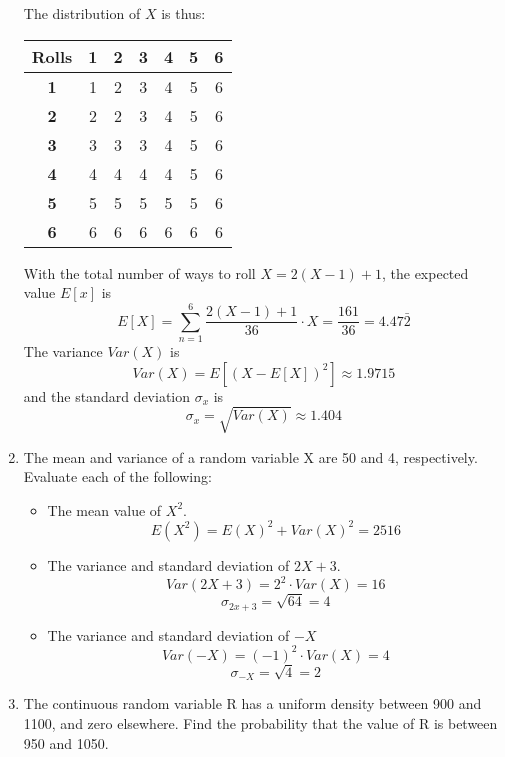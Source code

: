 \documentclass[12pt]{article}
\begin{document}
\begin{enumerate}
\begin{itemize}
\end{itemize}
The distribution of $X$ is thus:
\begin{center}
  \begin{tabular}{ |c|c|c|c|c|c|c| }
    \hline
    Rolls & \textbf{1} & \textbf{2} & \textbf{3} & \textbf{4} & \textbf{5} & \textbf{6} \\
    \hline
    \textbf{1} & 1 & 2 & 3 & 4 & 5 & 6 \\
    \textbf{2} & 2 & 2 & 3 & 4 & 5 & 6 \\
    \textbf{3} & 3 & 3 & 3 & 4 & 5 & 6 \\
    \textbf{4} & 4 & 4 & 4 & 4 & 5 & 6 \\
    \textbf{5} & 5 & 5 & 5 & 5 & 5 & 6 \\
    \textbf{6} & 6 & 6 & 6 & 6 & 6 & 6 \\
    \hline
  \end{tabular}
  \end{center}
With the total number of ways to roll $X = 2(X-1)+1$, the expected value $E[x]$ is
\[ E[X] = \sum_{n=1}^{6} \frac{2(X-1)+1}{36} \cdot X = \frac{161}{36} = 4.47\bar{2} \]
The variance $Var(X)$ is 
\[ Var(X) = E[(X - E[X])^2] \approx 1.9715 \]
and the standard deviation $\sigma_x$ is
\[ \sigma_x = \sqrt{Var(X)} \approx 1.404 \]
\newpage
\item The mean and variance of a random variable X are 50 and 4, respectively.  Evaluate each of the following:
  \begin{itemize}
  \item The mean value of $X^2$.
    \[ E(X^2) = E(X)^2 + Var(X)^2 = 2516 \]
  \item The variance and standard deviation of $2X+3$.
    \[ Var(2X+3) = 2^2 \cdot Var(X) = 16 \]
    \[ \sigma_{2x+3} = \sqrt{64} = 4 \]
  \item The variance and standard deviation of $-X$ 
    \[ Var(-X) = (-1)^2 \cdot Var(X) = 4 \]
    \[ \sigma_{-X} = \sqrt{4} = 2 \]    
  \end{itemize}
\item The continuous random variable R has a uniform density between 900 and 1100,  and zero elsewhere. Find the probability that the value of R is between 950 and 1050.\\ \\
\fbox{\begin{minipage}{30em}
\[ P(950 < X < 1050) = \frac{1050-950}{1100-900} = 0.5 \] 
\end{minipage}}
\end{enumerate}
\end{document}
